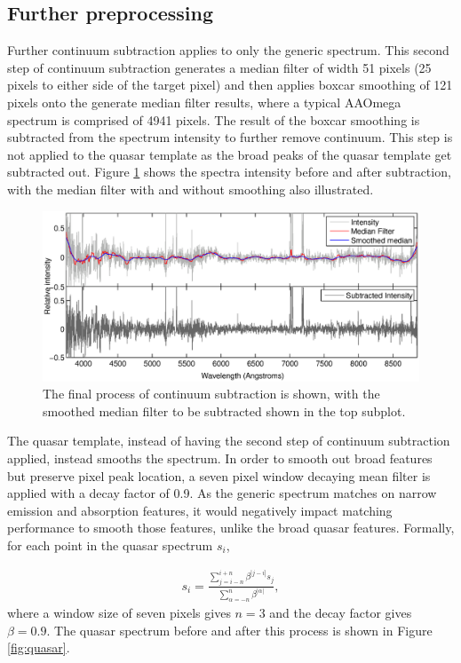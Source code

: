 \documentclass[titlesmallcaps, examinerscopy, copyrightpage]{uqthesis}
\newcommand\abs[1]{\left|#1\right|}
\begin{document}
\subsection{Further preprocessing}

Further continuum subtraction applies to only the generic spectrum. This second step of continuum subtraction generates a median filter of width 51 pixels (25 pixels to either side of the target pixel) and then applies boxcar smoothing of 121 pixels onto the generate median filter results, where a typical AAOmega spectrum is comprised of 4941 pixels. The result of the boxcar smoothing is subtracted from the spectrum intensity to further remove continuum. This step is not applied to the quasar template as the broad peaks of the quasar template get subtracted out. Figure \ref{fig:smooth} shows the spectra intensity before and after subtraction, with the median filter with and without smoothing also illustrated.\\
\begin{figure}[ht!]
\includegraphics[width=\textwidth]{images/smoothing.eps} 
\centering
\caption{The final process of continuum subtraction is shown, with the smoothed median filter to be subtracted shown in the top subplot.}
\label{fig:smooth}
\end{figure}


The quasar template, instead of having the second step of continuum subtraction applied, instead smooths the spectrum. In order to smooth out broad features but preserve pixel peak location, a seven pixel window decaying mean filter is applied with a decay factor of 0.9. As the generic spectrum matches on narrow emission and absorption features, it would negatively impact matching performance to smooth those features, unlike the broad quasar features. Formally, for each point in the quasar spectrum $s_i$, 

\begin{align}
s_i = \frac{\sum\limits_{j = i -n}^{i+n} \beta^{\abs{j-i}} s_j}{\sum\limits_{\alpha=-n}^n \beta^{\abs{\alpha}}},
\end{align}
where a window size of seven pixels gives $n=3$ and the decay factor gives $\beta = 0.9$. The quasar spectrum before and after this process is shown in Figure \ref{fig:quasar}.
\end{document}
